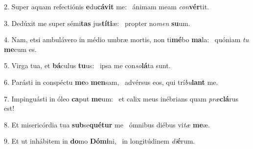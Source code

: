 2. Super aquam refectiónis \textbf{e}du\textbf{cá}\textbf{vit} me: \ast\  ánimam meam \textit{con}\textbf{vér}tit.\

3. Dedúxit me super sémi\textbf{tas} jus\textbf{tí}\textbf{ti}æ: \ast\  propter no\textit{men} \textbf{su}um.\

4. Nam, etsi ambulávero in médio umbræ mortis, non ti\textbf{mé}bo \textbf{ma}la: \ast\  quóniam \textit{tu} \textbf{me}cum es.\

5. Virga tua, et \textbf{bá}culus \textbf{tu}us: \ast\  ipsa me con\textit{so}\textbf{lá}ta sunt.\

6. Parásti in conspéctu \textbf{me}o \textbf{men}sam, \ast\  advérsus eos, qui trí\textit{bu}\textbf{lant} me.\

7. Impinguásti in óleo \textbf{ca}put \textbf{me}um: \ast\  et calix meus inébrians quam \textit{præ}\textbf{clá}rus est!\

8. Et misericórdia tua \textbf{sub}se\textbf{qué}\textbf{tur} me \ast\  ómnibus diébus vi\textit{tæ} \textbf{me}æ.\

9. Et ut inhábitem in \textbf{do}mo \textbf{Dó}\textbf{mi}ni, \ast\  in longitúdinem \textit{di}\textbf{é}rum.\


